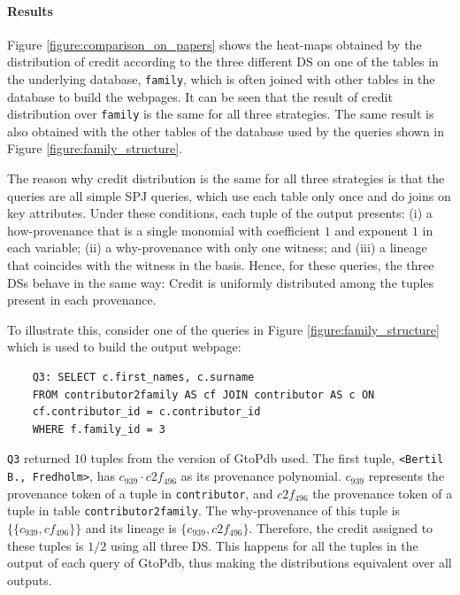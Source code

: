 \paragraph{Results} Figure \ref{figure:comparison_on_papers} shows the heat-maps obtained by the distribution of credit according to the three different DS on one of the tables in the underlying database, \texttt{family},
which is often joined with other tables in the database to build the webpages.
It can be seen that the result of  credit distribution over \texttt{family} is the same for all three strategies. The same result is also obtained with the other tables of the database used by the queries shown in Figure \ref{figure:family_structure}. 

The reason why credit distribution is the same for all three strategies is that the queries are all simple SPJ queries, which use each table only once and do joins on key attributes. 
Under these conditions, each tuple of the output presents: (i) a how-provenance that is a single monomial with coefficient $1$ and exponent $1$ in each variable; (ii) a why-provenance with only one witness; and (iii) a lineage that coincides with the witness in the basis.
Hence, for these queries, the three DSs behave in the same way:
Credit is uniformly distributed among the tuples present in each provenance. 

To illustrate this, consider one of the queries in Figure \ref{figure:family_structure} which is used to build the output webpage:

\vspace{2mm}
{\footnotesize
\begin{adjustwidth}{25pt}{5pt}
	\begin{verbatim}
	Q3: SELECT c.first_names, c.surname
	FROM contributor2family AS cf JOIN contributor AS c ON 
	cf.contributor_id = c.contributor_id 
	WHERE f.family_id = 3
\end{verbatim}
\end{adjustwidth}
}
\vspace{2mm}

\texttt{Q3} returned $10$ tuples from the version of GtoPdb used. 
The first tuple, \texttt{<Bertil B., Fredholm>}, has  $c_{939} \cdot c2f_{496}$ as its provenance polynomial.
$c_{939}$ represents the provenance token of a tuple in \texttt{contributor}, and $c2f_{496}$ the provenance token of a tuple in table \texttt{contributor2family}. 
The why-provenance of this tuple is $\{\{c_{939}, cf_{496} \}\}$ and its lineage is $\{c_{939}, c2f_{496} \}$.
Therefore, the credit assigned to these tuples is $1/2$ using all three DS.
This happens for all the tuples in the output of each query of GtoPdb, thus making the distributions equivalent over all outputs.

